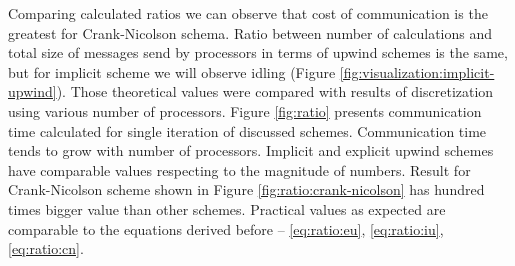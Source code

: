 	Comparing calculated ratios we can observe that cost of communication is the greatest for Crank-Nicolson schema. Ratio between number of calculations and total size of messages send by processors in terms of upwind schemes is the same, but for implicit scheme we will observe idling (Figure \ref{fig:visualization:implicit-upwind}). Those theoretical values were compared with results of discretization using various number of processors. Figure \ref{fig:ratio} presents communication time calculated for single iteration of discussed schemes. Communication time tends to grow with number of processors. Implicit and explicit upwind schemes have comparable values respecting to the magnitude of numbers. Result for Crank-Nicolson scheme shown in Figure \ref{fig:ratio:crank-nicolson} has hundred times bigger value than other schemes. Practical values as expected are comparable to the equations derived before -- \eqref{eq:ratio:eu}, \eqref{eq:ratio:iu}, \eqref{eq:ratio:cn}.
